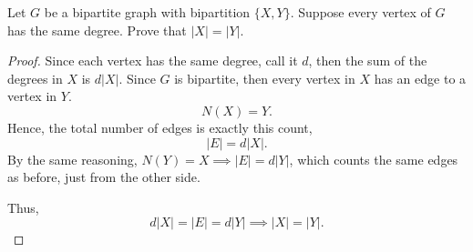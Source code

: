\documentclass[../hw5]{subfiles}
\begin{document}
\begin{problem}
Let $G$ be a bipartite graph with bipartition $\{X,Y\}$. Suppose every vertex of $G$ has the same degree. Prove that $|X| = |Y|$.
\end{problem}
\begin{proof}
	Since each vertex has the same degree, call it $d$, then the sum of the degrees in  $X$ is  $d|X|$.
	Since  $G$ is bipartite, then every vertex in  $X$ has an edge to a vertex in  $Y$.  \[
		N(X)=Y
		.\]
	Hence, the total number of edges is exactly this count, \[
		|E| = d|X|
		.\]
	By the same reasoning, $N(Y)=X\implies |E| = d|Y|$, which counts the same edges as before, just from the other side.

	Thus,  \[
		d|X| = |E| = d|Y| \implies |X| = |Y|
		.\]
\end{proof}
\end{document}
